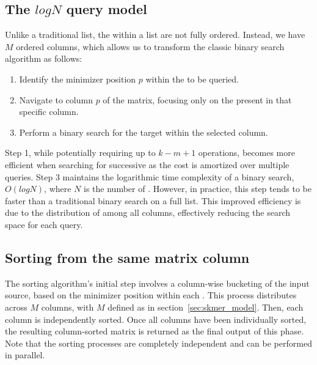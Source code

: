 \subsection{The $log{N}$ query model}
Unlike a traditional \kmer list, the \kmers within a \skmer list are not fully ordered. Instead, we have $M$ ordered columns, which allows us to transform the classic binary search algorithm as follows:
\begin{enumerate}
	\item Identify the minimizer position $p$ within the \kmer to be queried.
	\item Navigate to column $p$ of the matrix, focusing only on the \kmers present in that specific column.
	\item Perform a binary search for the target \kmer within the selected column.
\end{enumerate}
Step 1, while potentially requiring up to $k-m+1$ operations, becomes more efficient when searching for successive \kmers as the cost is amortized over multiple queries.
Step 3 maintains the logarithmic time complexity of a binary search, $O(log N)$, where $N$ is the number of \skmers. However, in practice, this step tends to be faster than a traditional binary search on a full \kmer list. This improved efficiency is due to the distribution of \kmers among all columns, effectively reducing the search space for each query.

\subsection{Sorting \kmers from the same matrix column}
\label{sec:skmersorting}
The sorting algorithm's initial step involves a column-wise bucketing of the input \kmer source, based on the minimizer position within each \kmer. This process distributes \kmers across $M$ columns, with $M$ defined as in section~\ref{sec:skmer_model}. Then, each column is independently sorted. Once all columns have been individually sorted, the resulting column-sorted matrix is returned as the final output of this phase. Note that the sorting processes are completely independent and can be performed in parallel.\\

